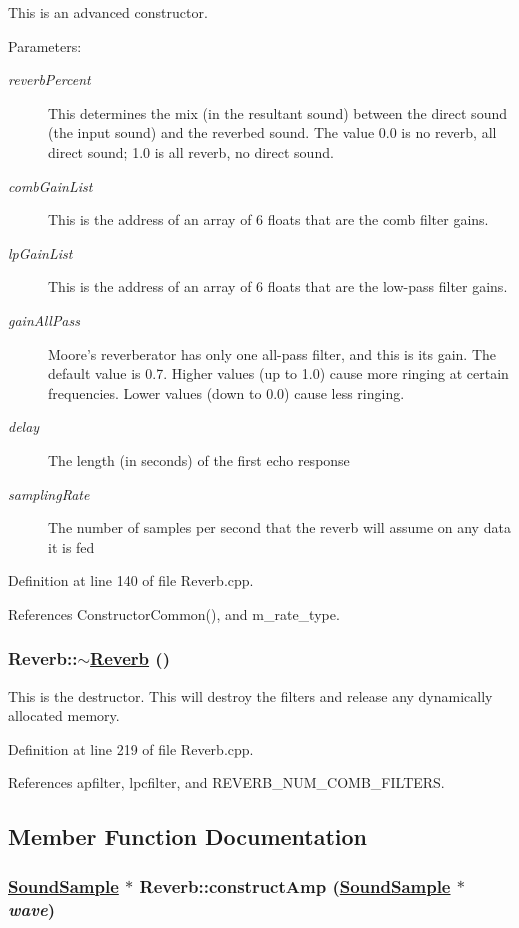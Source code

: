 This is an advanced constructor. \begin{Desc}
\item[Parameters:]
\begin{description}
\item[{\em reverb\-Percent}]This determines the mix (in the resultant sound) between the direct sound (the input sound) and the reverbed sound. The value 0.0 is no reverb, all direct sound; 1.0 is all reverb, no direct sound. \item[{\em comb\-Gain\-List}]This is the address of an array of 6 floats that are the comb filter gains. \item[{\em lp\-Gain\-List}]This is the address of an array of 6 floats that are the low-pass filter gains. \item[{\em gain\-All\-Pass}]Moore's reverberator has only one all-pass filter, and this is its gain. The default value is 0.7. Higher values (up to 1.0) cause more ringing at certain frequencies. Lower values (down to 0.0) cause less ringing. \item[{\em delay}]The length (in seconds) of the first echo response \item[{\em sampling\-Rate}]The number of samples per second that the reverb will assume on any data it is fed \end{description}
\end{Desc}


Definition at line 140 of file Reverb.cpp.

References Constructor\-Common(), and m\_\-rate\_\-type.\hypertarget{classReverb_a5}{
\subsubsection[$\sim$Reverb]{\setlength{\rightskip}{0pt plus 5cm}Reverb::$\sim$\hyperlink{classReverb}{Reverb} ()}}
\label{classReverb_a5}


This is the destructor. This will destroy the filters and release any dynamically allocated memory. 

Definition at line 219 of file Reverb.cpp.

References apfilter, lpcfilter, and REVERB\_\-NUM\_\-COMB\_\-FILTERS.

\subsection{Member Function Documentation}
\hypertarget{classReverb_d0}{
\subsubsection[constructAmp]{\setlength{\rightskip}{0pt plus 5cm}\hyperlink{classSoundSample}{Sound\-Sample} $\ast$ Reverb::construct\-Amp (\hyperlink{classSoundSample}{Sound\-Sample} $\ast$ {\em wave})}}
\label{classReverb_d0}



